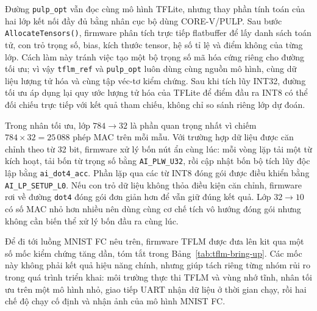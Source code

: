 \documentclass[../DoAn.tex]{subfiles}
\begin{document}
Đường \texttt{pulp\_opt} vẫn đọc cùng mô hình TFLite, nhưng thay phần tính toán của hai lớp kết nối đầy đủ bằng nhân cục bộ dùng CORE-V/PULP. Sau bước \texttt{AllocateTensors()}, firmware phân tích trực tiếp flatbuffer để lấy danh sách toán tử, con trỏ trọng số, bias, kích thước tensor, hệ số tỉ lệ và điểm không của từng lớp. Cách làm này tránh việc tạo một bộ trọng số mã hóa cứng riêng cho đường tối ưu; vì vậy \texttt{tflm\_ref} và \texttt{pulp\_opt} luôn dùng cùng nguồn mô hình, cùng dữ liệu lượng tử hóa và cùng tập véc-tơ kiểm chứng. Sau khi tích lũy INT32, đường tối ưu áp dụng lại quy ước lượng tử hóa của TFLite để điểm đầu ra INT8 có thể đối chiếu trực tiếp với kết quả tham chiếu, không chỉ so sánh riêng lớp dự đoán.

Trong nhân tối ưu, lớp \(784 \rightarrow 32\) là phần quan trọng nhất vì chiếm \(784 \times 32 = 25\,088\) phép MAC trên mỗi mẫu. Với trường hợp dữ liệu được căn chỉnh theo từ 32 bit, firmware xử lý bốn nút ẩn cùng lúc: mỗi vòng lặp tải một từ kích hoạt, tải bốn từ trọng số bằng \texttt{AI\_PLW\_U32}, rồi cập nhật bốn bộ tích lũy độc lập bằng \texttt{ai\_dot4\_acc}. Phần lặp qua các từ INT8 đóng gói được điều khiển bằng \texttt{AI\_LP\_SETUP\_L0}. Nếu con trỏ dữ liệu không thỏa điều kiện căn chỉnh, firmware rơi về đường \texttt{dot4} đóng gói đơn giản hơn để vẫn giữ đúng kết quả. Lớp \(32 \rightarrow 10\) có số MAC nhỏ hơn nhiều nên dùng cùng cơ chế tích vô hướng đóng gói nhưng không cần biến thể xử lý bốn đầu ra cùng lúc.

Để đi tới luồng MNIST FC nêu trên, firmware TFLM được đưa lên kit qua một số mốc kiểm chứng tăng dần, tóm tắt trong Bảng~\ref{tab:tflm-bring-up}. Các mốc này không phải kết quả hiệu năng chính, nhưng giúp tách riêng từng nhóm rủi ro trong quá trình triển khai: môi trường thực thi TFLM và vùng nhớ tĩnh, nhân tối ưu trên một mô hình nhỏ, giao tiếp UART nhận dữ liệu ở thời gian chạy, rồi hai chế độ chạy cố định và nhận ảnh của mô hình MNIST FC.
\end{document}
